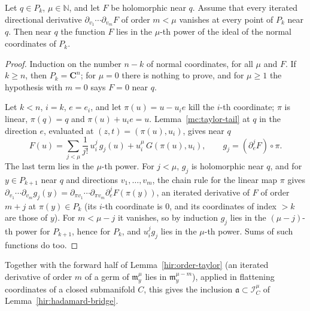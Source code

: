 \begin{lemma}
\label{mc:normal-vanishing}
\leanok
Let \(q\in P_k\), \(\mu\in\mathbb N\), and let \(F\) be holomorphic near \(q\). Assume that every iterated directional derivative
\(\partial_{v_1}\cdots\partial_{v_m}F\) of order \(m<\mu\) vanishes at every point of \(P_k\) near \(q\). Then near \(q\) the function \(F\)
lies in the \(\mu\)-th power of the ideal of the normal coordinates of \(P_k\).
\end{lemma}
\begin{proof}
\leanok
Induction on the number \(n-k\) of normal coordinates, for all \(\mu\) and \(F\). If \(k\ge n\), then \(P_k=\mathbf C^n\); for
\(\mu=0\) there is nothing to prove, and for \(\mu\ge1\) the hypothesis with \(m=0\) says \(F=0\) near \(q\).

Let \(k<n\), \(i=k\), \(e=e_i\), and let \(\pi(u)=u-u_ie\) kill the \(i\)-th coordinate; \(\pi\) is linear, \(\pi(q)=q\) and
\(\pi(u)+u_ie=u\). Lemma~\ref{mc:taylor-tail} at \(q\) in the direction \(e\), evaluated at \((z,t)=(\pi(u),u_i)\), gives near \(q\)
\[
 F(u)=\sum_{j<\mu}\frac1{j!}\,u_i^j\,g_j(u)+u_i^\mu\,G(\pi(u),u_i),\qquad g_j=(\partial_e^jF)\circ\pi .
\]
The last term lies in the \(\mu\)-th power. For \(j<\mu\), \(g_j\) is holomorphic near \(q\), and for \(y\in P_{k+1}\) near \(q\) and
directions \(v_1,\dots,v_m\), the chain rule for the linear map \(\pi\) gives
\(\partial_{v_1}\cdots\partial_{v_m}g_j(y)=\partial_{\pi v_1}\cdots\partial_{\pi v_m}\partial_e^jF(\pi(y))\), an iterated derivative of \(F\) of
order \(m+j\) at \(\pi(y)\in P_k\) (its \(i\)-th coordinate is \(0\), and its coordinates of index \(>k\) are those of \(y\)). For
\(m<\mu-j\) it vanishes, so by induction \(g_j\) lies in the \((\mu-j)\)-th power for \(P_{k+1}\), hence for \(P_k\), and
\(u_i^jg_j\) lies in the \(\mu\)-th power. Sums of such functions do too.
\end{proof}
Together with the forward half of Lemma~\ref{hir:order-taylor} (an iterated derivative of order \(m\) of a germ of
\(\mathfrak m_y^\mu\) lies in \(\mathfrak m_y^{\mu-m}\)), applied in flattening coordinates of a closed submanifold \(C\), this gives
the inclusion \(\mathfrak a\subset\mathcal I_C^\mu\) of Lemma~\ref{hir:hadamard-bridge}.

